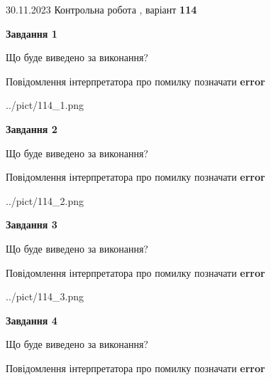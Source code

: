 \documentclass[12pt, ukrainian]{article}
\begin{document}
{{30.11.2023 Контрольна робота , варіант  \No \textbf { 114 }\par}}
{




{\begin {center}\textbf{Завдання 1}\end {center}}\par
Що буде виведено за виконання? \par
Повідомлення інтерпретатора про помилку позначати \textbf{error}

\begin{center}
	{../pict/114_1.png}
\end{center}
\newpage

{\begin {center}\textbf{Завдання 2}\end {center}}\par
Що буде виведено за виконання? \par
Повідомлення інтерпретатора про помилку позначати \textbf{error}

\begin{center}
	{../pict/114_2.png}
\end{center}
\newpage

{\begin {center}\textbf{Завдання 3}\end {center}}\par
Що буде виведено за виконання? \par
Повідомлення інтерпретатора про помилку позначати \textbf{error}

\begin{center}
	{../pict/114_3.png}
\end{center}
\newpage

{\begin {center}\textbf{Завдання 4}\end {center}}\par
Що буде виведено за виконання? \par
Повідомлення інтерпретатора про помилку позначати \textbf{error}

}
\end{document}

